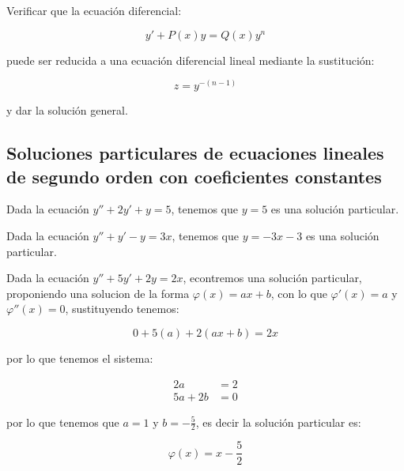 		\begin{ejemplo}
		\end{ejemplo}

		\begin{ejercicio}
			Verificar que la ecuación diferencial:

			\begin{equation*}
				y' + P(x) y = Q(x) y^n
			\end{equation*}

			puede ser reducida a una ecuación diferencial lineal mediante la sustitución:

			\begin{equation*}
				z = y^{-(n-1)}
			\end{equation*}

			y dar la solución general.
		\end{ejercicio}

	\newpage
	\subsection{Soluciones particulares de ecuaciones lineales de segundo orden con coeficientes constantes}

		\begin{ejemplo}
			Dada la ecuación $y'' + 2 y' + y = 5$, tenemos que $y = 5$ es una solución particular.
		\end{ejemplo}

		\begin{ejemplo}
			Dada la ecuación $y'' + y' - y = 3x$, tenemos que $y = -3x - 3$ es una solución particular.
		\end{ejemplo}

		\begin{ejemplo}
			Dada la ecuación $y'' + 5 y' + 2 y = 2 x$, econtremos una solución particular, proponiendo una solucion de la forma $\varphi(x) = a x + b$, con lo que $\varphi'(x) = a$ y $\varphi''(x) = 0$, sustituyendo tenemos:

			\begin{equation*}
				0 + 5 (a) + 2 (a x + b) = 2 x
			\end{equation*}

			por lo que tenemos el sistema:

			\begin{align*}
				2a &= 2 \\
				5a + 2b &= 0
			\end{align*}

			por lo que tenemos que $a = 1$ y $b = - \frac{5}{2}$, es decir la solución particular es:

			\begin{equation*}
				\varphi(x) = x - \frac{5}{2}
			\end{equation*}
		\end{ejemplo}


